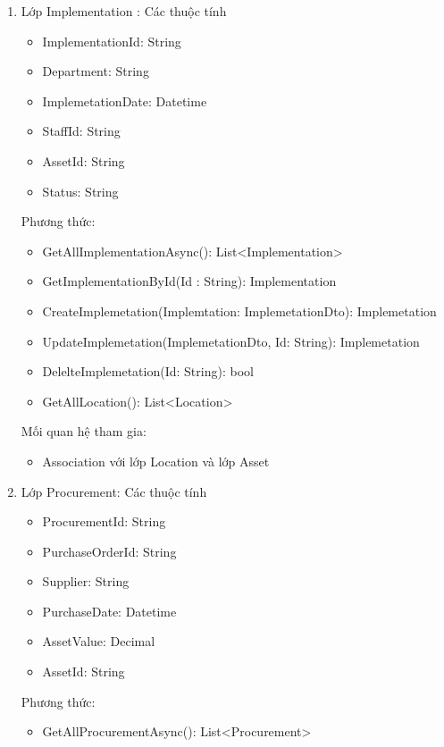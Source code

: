 \begin{enumerate}
\begin{itemize}[label=--]
    \end{itemize}
    \item Lớp Implementation :
    Các thuộc tính
    \begin{itemize}[label=--]
        \item ImplementationId: String
        \item Department: String
        \item ImplemetationDate: Datetime
        \item StaffId: String
        \item AssetId: String
        \item Status: String
    \end{itemize}
    Phương thức:
    \begin{itemize}[label=--]
        \item GetAllImplementationAsync(): List<Implementation>
        \item GetImplementationById(Id : String): Implementation
        \item CreateImplemetation(Implemtation: ImplemetationDto): Implemetation
        \item UpdateImplemetation(ImplemetationDto, Id: String): Implemetation
        \item DelelteImplemetation(Id: String): bool 
        \item GetAllLocation(): List<Location>
    \end{itemize}
    Mối quan hệ tham gia:
    \begin{itemize}[label=--]
        \item Association với lớp Location và lớp Asset
    \end{itemize}
    \item Lớp Procurement:
    Các thuộc tính
    \begin{itemize}[label=--]
        \item ProcurementId: String
        \item PurchaseOrderId: String
        \item Supplier: String
        \item PurchaseDate: Datetime
        \item AssetValue: Decimal 
        \item AssetId: String
    \end{itemize}
    Phương thức:
    \begin{itemize}[label=--]
        \item GetAllProcurementAsync(): List<Procurement>

\end{itemize}
\end{enumerate}

